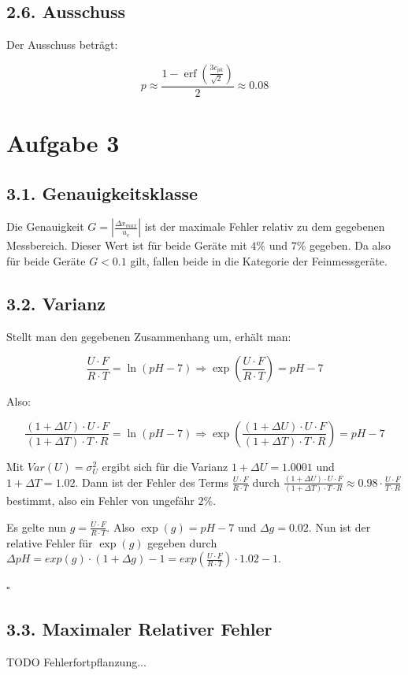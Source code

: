 \documentclass[12pt,a4paper]{article}
\DeclareMathOperator\erf{erf}
\begin{document}
\subsection*{2.6. Ausschuss}
Der Ausschuss beträgt:

\[
p \approx \frac{1 - \erf\left(\frac{3 c_{pk}}{\sqrt{2}}\right)}{2} \approx 0.08
\]

\pagebreak
\section*{Aufgabe 3}
\subsection*{3.1. Genauigkeitsklasse}
Die Genauigkeit $G = \left| \frac{\Delta x_{max}}{u_e} \right|$ ist der maximale Fehler relativ zu dem gegebenen Messbereich. Dieser Wert ist für beide Geräte mit $4\%$ und $7\%$ gegeben. Da also für beide Geräte $G < 0.1$ gilt, fallen beide in die Kategorie der Feinmessgeräte.

\subsection*{3.2. Varianz}
Stellt man den gegebenen Zusammenhang um, erhält man:

\[
\frac{U \cdot F}{R \cdot T} = \ln(pH - 7) \Rightarrow \exp\left(\frac{U \cdot F}{R \cdot T}\right) = pH - 7
\]

Also:

\[
\frac{(1 + \Delta U) \cdot U \cdot F}{(1 + \Delta T) \cdot T \cdot R} = \ln(pH - 7) \Rightarrow \exp\left(\frac{(1 + \Delta U) \cdot U \cdot F}{(1 + \Delta T) \cdot T \cdot R}\right) = pH - 7
\]

Mit $Var(U) = \sigma_U^2$ ergibt sich für die Varianz $1 + \Delta U = 1.0001$ und $1 + \Delta T = 1.02$. Dann ist der Fehler des Terms $\frac{U \cdot F}{R \cdot T}$ durch $\frac{(1 + \Delta U) \cdot U \cdot F}{(1 + \Delta T) \cdot T \cdot R} \approx 0.98 \cdot \frac{U \cdot F}{T \cdot R}$ bestimmt, also ein Fehler von ungefähr $2\%$.

Es gelte nun $g = \frac{U \cdot F}{R \cdot T}$. Also $\exp(g) = pH - 7$ und $\Delta g = 0.02$. Nun ist der relative Fehler für $\exp(g)$ gegeben durch $\Delta pH = exp(g) \cdot (1 + \Delta g) - 1 = exp\left(\frac{U \cdot F}{R \cdot T}\right) \cdot 1.02 -1$.
\begin{flushright}
$\square$
\end{flushright}

\subsection*{3.3. Maximaler Relativer Fehler}
TODO Fehlerfortpflanzung...
\end{document}
